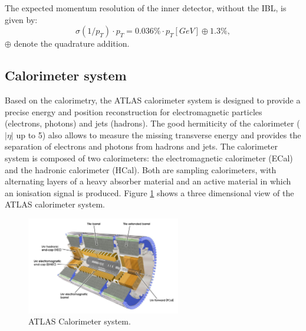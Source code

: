 The expected momentum resolution of the inner detector, without the IBL, is given by:
\begin{equation}
    \sigma(1/p_T)\cdot p_T = 0.036\%\cdot p_T [GeV] \oplus 1.3\%,
\end{equation}
$\oplus$ denote the quadrature addition.
\subsection{Calorimeter system}
\label{chap2:ATLAS:Calo}

Based on the calorimetry, the ATLAS calorimeter system is designed to provide a precise energy and position reconstruction for electromagnetic particles (electrons, photons) and jets (hadrons). The good hermiticity of the calorimeter ($|\eta|$ up to 5) also allows to measure the missing transverse energy and provides the separation of electrons and photons from hadrons and jets. The calorimeter system is composed of two calorimeters: the electromagnetic calorimeter (ECal) and the hadronic calorimeter (HCal). Both are sampling calorimeters, with alternating layers of a heavy absorber material and an active material in which an ionisation signal is produced. Figure \ref{fig:chap2:ATLAS:Calo} shows a three dimensional view of the ATLAS calorimeter system.
\begin{figure}[htbp]
    \centering
    \includegraphics[width=0.6\textwidth]{Ch2/Img/Calo.png}
    \caption{ATLAS Calorimeter system.}
    \label{fig:chap2:ATLAS:Calo}
\end{figure}


